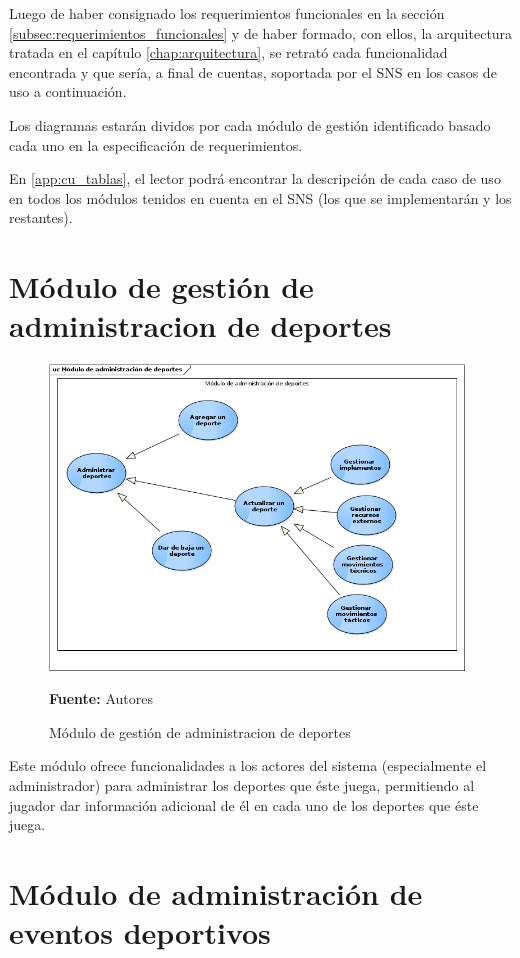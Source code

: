 Luego de haber consignado los requerimientos funcionales en la sección \ref{subsec:requerimientos_funcionales} y de haber formado, con ellos, la arquitectura tratada en el capítulo \ref{chap:arquitectura}, se retrató cada funcionalidad encontrada y que sería, a final de cuentas, soportada por el SNS en los casos de uso a continuación.

Los diagramas estarán dividos por cada módulo de gestión identificado basado cada uno en la especificación de requerimientos.

En \ref{app:cu_tablas}, el lector podrá encontrar la descripción de cada caso de uso en todos los módulos tenidos en cuenta en el SNS (los que se implementarán y los restantes).

\section{Módulo de gestión de administracion de deportes}


\begin{figure}[!htb]
  \begin{center}
    \includegraphics[width=11cm]{./imagenes/casos_uso/administracion_deportes.png}
    \caption{Módulo de gestión de administracion de deportes}
    \label{fig:cu_admin_dep}
    \textbf{Fuente:} Autores
  \end{center}
\end{figure}

Este módulo ofrece funcionalidades a los actores del sistema (especialmente el administrador) para administrar los deportes que éste juega, permitiendo al jugador dar información adicional de él en cada uno de los deportes que éste juega.

\section{Módulo de administración de eventos deportivos}

